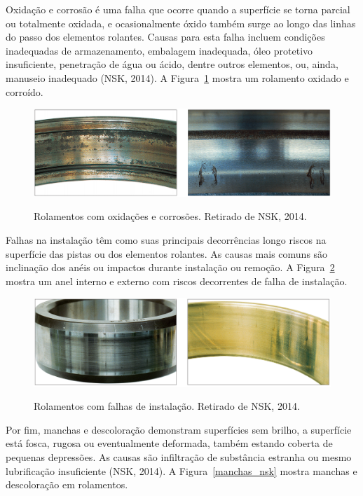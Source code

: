 \documentclass[
	12pt,				
	oneside,			
	a4paper,			
	english,			
	brazil,			
	]{abntex2ppgsi}
\begin{document}
Oxidação e corrosão é uma falha que ocorre quando a superfície se torna parcial ou totalmente oxidada, e ocasionalmente óxido também surge ao longo das linhas do passo dos elementos rolantes. Causas para esta falha incluem condições inadequadas de armazenamento, embalagem inadequada, óleo protetivo insuficiente, penetração de água ou ácido, dentre outros elementos, ou, ainda, manuseio inadequado (NSK, 2014). A Figura~\ref{oxidacao_nsk} mostra um rolamento oxidado e corroído.

\begin{figure}[H]
\centering
\caption {Rolamentos com oxidações e corrosões. Retirado de NSK, 2014.}
\includegraphics[width=\textwidth,height=\textheight,keepaspectratio]{oxidacao_nsk}
\label{oxidacao_nsk}
\end{figure}

Falhas na instalação têm como suas principais decorrências longo riscos na superfície das pistas ou dos elementos rolantes. As causas mais comuns são inclinação dos anéis ou impactos durante instalação ou remoção. A Figura~\ref{falha_instalacao_nsk} mostra um anel interno e externo com riscos decorrentes de falha de instalação.

\begin{figure}[H]
\centering
\caption {Rolamentos com falhas de instalação. Retirado de NSK, 2014.}
\includegraphics[width=\textwidth,height=\textheight,keepaspectratio]{falha_instalacao_nsk}
\label{falha_instalacao_nsk}
\end{figure}

Por fim, manchas e descoloração demonstram superfícies sem brilho, a superfície está fosca, rugosa ou eventualmente deformada, também estando coberta de pequenas depressões. As causas são infiltração de substância estranha ou mesmo lubrificação insuficiente (NSK, 2014). A Figura~\ref{manchas_nsk} mostra manchas e descoloração em rolamentos.
\end{document}
